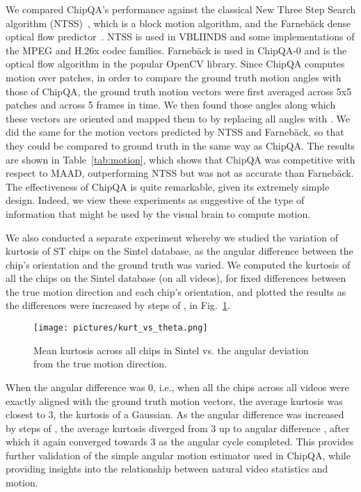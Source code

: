 \documentclass[journal]{IEEEtran}
\begin{document}
We compared ChipQA's performance against the classical New Three Step Search algorithm (NTSS)~\cite{ntss}, which is a block motion algorithm, and the Farneb\"{a}ck dense optical flow predictor~\cite{farneback}. NTSS is used in VBLIINDS and some implementations of the MPEG and  H.26x codec families. Farneb\"{a}ck is used in ChipQA-0 and is the optical flow algorithm in the popular OpenCV library. Since ChipQA computes motion over patches, in order to compare the ground truth motion angles with those of ChipQA, the ground truth motion vectors were first averaged across 5x5 patches and across 5 frames in time. We then found those angles along which these vectors are oriented and mapped them to  by replacing all angles  with . We did the same for the motion vectors predicted by NTSS and Farneb\"{a}ck, so that they could be compared to ground truth in the same way as ChipQA. The results are shown in Table~\ref{tab:motion}, which shows that ChipQA was competitive with respect to MAAD, outperforming NTSS but was not as accurate than Farneb\"{a}ck. The effectiveness of ChipQA is quite remarkable, given its extremely simple design. Indeed, we view these experiments as suggestive of the type of information that might be used by the visual brain to compute motion.

We also conducted a separate experiment whereby we studied the variation of kurtosis of ST chips on the Sintel database, as the angular difference between the chip's orientation and the ground truth was varied. We computed the kurtosis of all the chips on the Sintel database (on all videos), for fixed differences between the true motion direction and each chip's orientation, and plotted the results as the differences were increased by steps of , in Fig.~\ref{fig:kurt_vs_theta}.
\begin{figure} 
  \texttt{[image: pictures/kurt\_vs\_theta.png]}
  \caption{Mean kurtosis across all chips in Sintel vs. the angular deviation from the true motion direction.}\label{fig:kurt_vs_theta}
\end{figure}
When the angular difference was 0, i.e., when all the chips across all videos were exactly aligned with the ground truth motion vectors, the average kurtosis was closest to 3, the kurtosis of a Gaussian. As the angular difference was increased by steps of , the average kurtosis diverged from 3 up to angular difference , after which it again converged towards 3 as the angular cycle completed. This provides further validation of the simple angular motion estimator used in ChipQA, while providing insights into the relationship between natural video statistics and motion.
\end{document}

